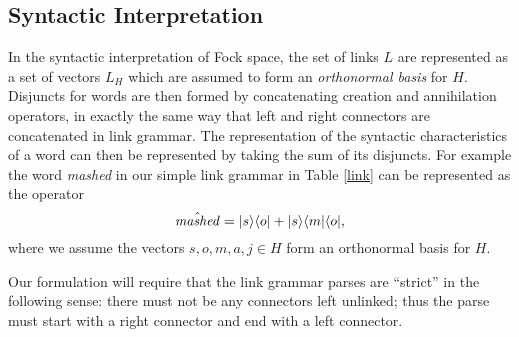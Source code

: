 \documentclass[12pt]{report}
\begin{document}
\subsection{Syntactic Interpretation}

In the syntactic interpretation of Fock space, the set of links $L$ are represented as a set of vectors $L_H$ which are assumed to form an \emph{orthonormal basis} for $H$. Disjuncts for words are then formed by concatenating creation and annihilation operators, in exactly the same way that left and right connectors are concatenated in link grammar. The representation of the syntactic characteristics of a word can then be represented by taking the sum of its disjuncts. For example the word \emph{mashed} in our simple link grammar in Table \ref{link} can be represented as the operator
$$\hat{\mathit{mashed}} = |s \rangle\langle o| + |s \rangle\langle m|\langle o|,$$
where we assume the vectors $s,o,m,a,j \in H$ form an orthonormal basis for $H$.

Our formulation will require that the link grammar parses are ``strict'' in the following sense: there must not be any connectors left unlinked; thus the parse must start with a right connector and end with a left connector.
\end{document}
